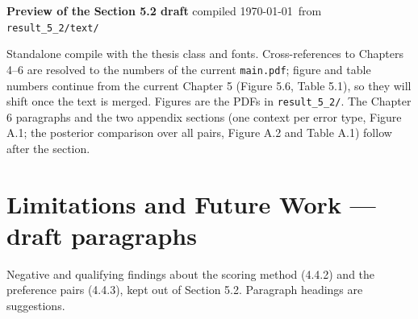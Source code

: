 \documentclass[headsepline,footsepline,footinclude=false,oneside,fontsize=11pt,paper=a4,listof=totoc,bibliography=totoc,DIV=12]{scrbook}
\begin{document}

\setcounter{page}{55}
\setcounter{chapter}{5}
\setcounter{section}{1}
\setcounter{figure}{6}
\setcounter{table}{1}

\noindent\textbf{Preview of the Section 5.2 draft} \hfill \small compiled \today\ from \texttt{result\_5\_2/text/}\normalsize

\medskip
\noindent\small Standalone compile with the thesis class and fonts. Cross-references to Chapters 4--6 are resolved to the numbers of the current \texttt{main.pdf}; figure and table numbers continue from the current Chapter 5 (Figure 5.6, Table 5.1), so they will shift once the text is merged. Figures are the PDFs in \texttt{result\_5\_2/}. The Chapter 6 paragraphs and the two appendix sections (one context per error type, Figure A.1; the posterior comparison over all pairs, Figure A.2 and Table A.1) follow after the section.\normalsize

\bigskip


\clearpage
\setcounter{chapter}{6}
\setcounter{section}{1}
\setcounter{figure}{0}
\setcounter{table}{0}
\section{Limitations and Future Work --- draft paragraphs}
\noindent\small Negative and qualifying findings about the scoring method (4.4.2) and the preference pairs (4.4.3), kept out of Section 5.2. Paragraph headings are suggestions.\normalsize



\clearpage
\setcounter{chapter}{1}
\setcounter{section}{0}
\setcounter{figure}{0}
\setcounter{table}{0}
\renewcommand{\thechapter}{A}
\renewcommand{\thefigure}{A.\arabic{figure}}
\renewcommand{\thetable}{A.\arabic{table}}


\clearpage

\end{document}
